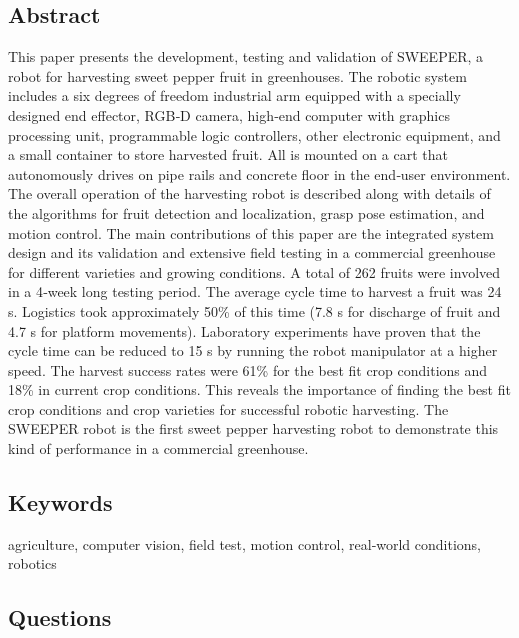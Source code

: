 \documentclass{article}
\begin{document}
\subsection*{Abstract}
This paper presents the development, testing and validation of SWEEPER, a robot for
harvesting sweet pepper fruit in greenhouses. The robotic system includes a six
degrees of freedom industrial arm equipped with a specially designed end effector,
RGB‐D camera, high‐end computer with graphics processing unit, programmable logic
controllers, other electronic equipment, and a small container to store harvested
fruit. All is mounted on a cart that autonomously drives on pipe rails and concrete
floor in the end‐user environment. The overall operation of the harvesting robot is
described along with details of the algorithms for fruit detection and localization,
grasp pose estimation, and motion control. The main contributions of this paper are
the integrated system design and its validation and extensive field testing in a
commercial greenhouse for different varieties and growing conditions. A total of 262
fruits were involved in a 4‐week long testing period. The average cycle time to
harvest a fruit was 24 s. Logistics took approximately 50\% of this time (7.8 s for
discharge of fruit and 4.7 s for platform movements). Laboratory experiments have
proven that the cycle time can be reduced to 15 s by running the robot manipulator at
a higher speed. The harvest success rates were 61\% for the best fit crop conditions
and 18\% in current crop conditions. This reveals the importance of finding the best fit
crop conditions and crop varieties for successful robotic harvesting. The SWEEPER
robot is the first sweet pepper harvesting robot to demonstrate this kind of
performance in a commercial greenhouse.


\subsection*{Keywords}
agriculture, computer vision, field test, motion control, real‐world conditions, robotics


\subsection*{Questions}
\end{document}
